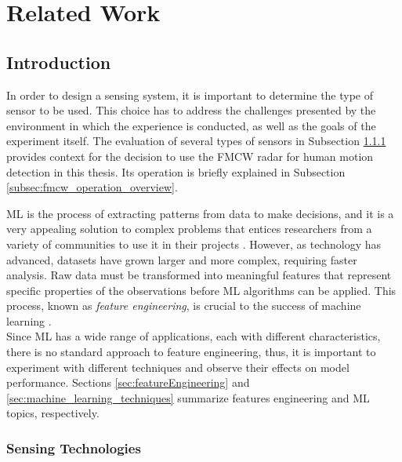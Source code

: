 
%

\chapter{Related Work}
\label{cha:related_work}

\section{Introduction}
\label{sec:introduction}

In order to design a sensing system, it is important to determine the type of sensor to be used. This choice has to address the challenges presented by the environment in which the experience is conducted, as well as the goals of the experiment itself. The evaluation of several types of sensors in Subsection \ref{subsec:sensing_technologies} provides context for the decision to use the \gls{FMCW} radar for human motion detection in this thesis. Its operation is briefly explained in Subsection \ref{subsec:fmcw_operation_overview}.

\gls{ML} is the process of extracting patterns from data to make decisions, and it is a very appealing solution to complex problems that entices researchers from a variety of communities to use it in their projects \cite{MLprospects_ch2intro}. However, as technology has advanced, datasets have grown larger and more complex, requiring faster analysis. Raw data must be transformed into meaningful features that represent specific properties of the observations before ML algorithms can be applied. This process, known as \textit{feature engineering}, is crucial to the success of machine learning \cite{ch2intro_featureEngineering}. \\
Since \gls{ML} has a wide range of applications, each with different characteristics, there is no standard approach to feature engineering, thus, it is important to experiment with different techniques and observe their effects on model performance. Sections \ref{sec:featureEngineering} and \ref{sec:machine_learning_techniques} summarize features engineering and ML topics, respectively. 

\subsection{Sensing Technologies}
\label{subsec:sensing_technologies}

